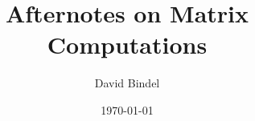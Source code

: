 \documentclass{SIAMGHbook2016}
\title{Afternotes on Matrix Computations}
\author{David Bindel}
\date{\today}
\begin{document}
\maketitle
\frontmatter
\tableofcontents



\begin{thepreface}

\end{thepreface}

\mainmatter

\end{document}
